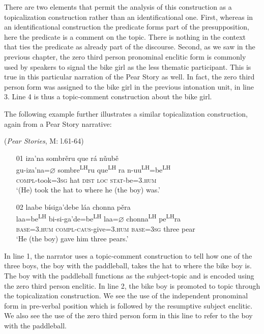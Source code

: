 There are two elements that permit the analysis of this construction as a topicalization construction rather than an identificational one. First, whereas in an identificational construction the predicate forms part of the presupposition, here the predicate is a comment on the topic. There is nothing in the context that ties the predicate as already part of the discourse. Second, as we saw in the previous chapter, the zero third person pronominal enclitic form is commonly used by speakers to signal the bike girl as the less thematic participant. This is true in this particular narration of the Pear Story as well. In fact, the zero third person form was assigned to the bike girl in the previous intonation unit, in line 3. Line 4 is thus a topic-comment construction about the bike girl.



The following example further illustrates a similar topicalization construction, again from a Pear Story narrative:

\ea\label{topicalization2} (\textit{Pear Stories}, M: l.61-64)

\begin{itemize}


\item[01] 
\glll iza'na sombr\v{e}ru que r\'{a} n\v{u}ub\v{e}  \\
gu-iza'na=$\varnothing$ sombre\textsuperscript{LH}ru que\textsuperscript{LH} ra n-uu\textsuperscript{LH}=be\textsuperscript{LH}  \\
\textsc{compl}-took=\textsc{3sg} hat \textsc{dist} \textsc{loc} \textsc{stat}-be=\textsc{3.hum}  \\
\glt `(He) took the hat to where he (the boy) was.'


\item[02]
\glll laabe b\'{i}siga'debe l\'{a}a chonna p\v{e}ra  \\
laa=be\textsuperscript{LH} bi-si-ga'de=be\textsuperscript{LH} laa=$\varnothing$ chonna\textsuperscript{LH} pe\textsuperscript{LH}ra  \\
\textsc{base}=\textsc{3.hum} \textsc{compl}-\textsc{caus}-give=\textsc{3.hum} \textsc{base}=\textsc{3sg} three pear  \\
\glt `He (the boy) gave him three pears.' 

\end{itemize}
\z
In line 1, the narrator uses a topic-comment construction to tell how one of the three boys, the boy with the paddleball, takes the hat to where the bike boy is. The boy with the paddleball functions as the subject-topic and is encoded using the zero third person enclitic. In line 2, the bike boy is promoted to topic through the topicalization construction. We see the use of the independent pronominal form in pre-verbal position which is followed by the resumptive subject enclitic. We also see the use of the zero third person form in this line to refer to the boy with the paddleball. 



